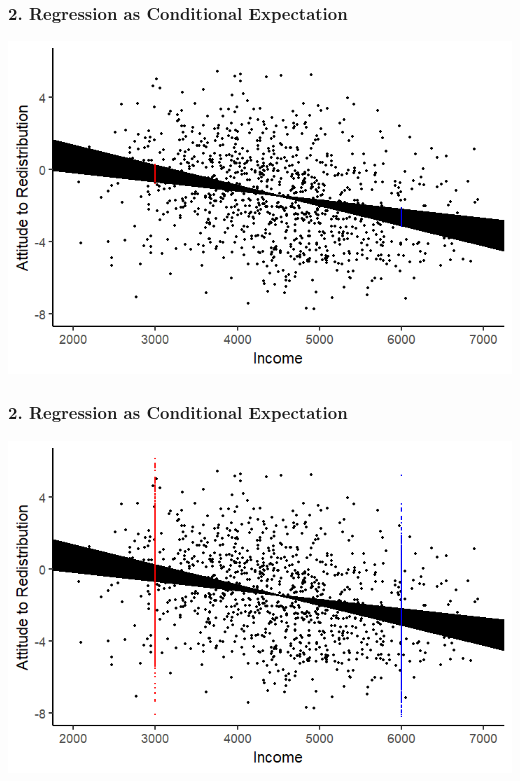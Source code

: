 \documentclass[xcolor=x11names,compress]{beamer}\usepackage[]{graphicx}\usepackage[]{color}
\makeatletter
\def\maxwidth{ %
  \ifdim\Gin@nat@width>\linewidth
    \linewidth
  \else
    \Gin@nat@width
  \fi
}
\newenvironment{knitrout}{}{} %
\renewcommand{\(}{\begin{columns}}
\renewcommand{\)}{\end{columns}}
\newcommand{\<}[1]{\begin{column}{#1}}
\renewcommand{\>}{\end{column}}
\makeatother
\begin{document}
\begin{frame}
\frametitle{2. Regression as Conditional Expectation}
\begin{knitrout}
\color{fgcolor}
\includegraphics[width=\maxwidth]{figure/cond_exp1h-1} 

\end{knitrout}
\end{frame}

\begin{frame}
\frametitle{2. Regression as Conditional Expectation}
\begin{knitrout}
\color{fgcolor}
\includegraphics[width=\maxwidth]{figure/cond_exp1i-1} 

\end{knitrout}
\end{frame}
\end{document}

